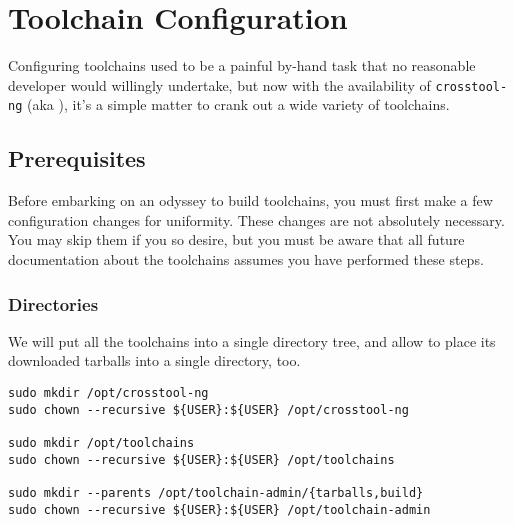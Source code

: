 %
%
%
%
\chapter{Toolchain Configuration}\label{chap:toolchain-configuration}

Configuring toolchains used to be a painful by-hand task that no
reasonable developer would willingly undertake, but now with the
availability of \texttt{crosstool-ng} (aka \ctng), it's a simple matter
to crank out a wide variety of toolchains.

\section{Prerequisites}\label{toolchain-config:prerequisites}

Before embarking on an odyssey to build toolchains, you must first
make a few configuration changes for uniformity.  These changes are
not absolutely necessary.  You may skip them if you so desire, but you
must be aware that all future documentation about the toolchains
assumes you have performed these steps.

\subsection{Directories}
We will put all the toolchains into a single directory tree, and
allow \ctng to place its downloaded tarballs into a single
directory, too.

\begin{footnotesize}
\begin{verbatim}
sudo mkdir /opt/crosstool-ng
sudo chown --recursive ${USER}:${USER} /opt/crosstool-ng

sudo mkdir /opt/toolchains
sudo chown --recursive ${USER}:${USER} /opt/toolchains

sudo mkdir --parents /opt/toolchain-admin/{tarballs,build}
sudo chown --recursive ${USER}:${USER} /opt/toolchain-admin
\end{verbatim}
\end{footnotesize}

